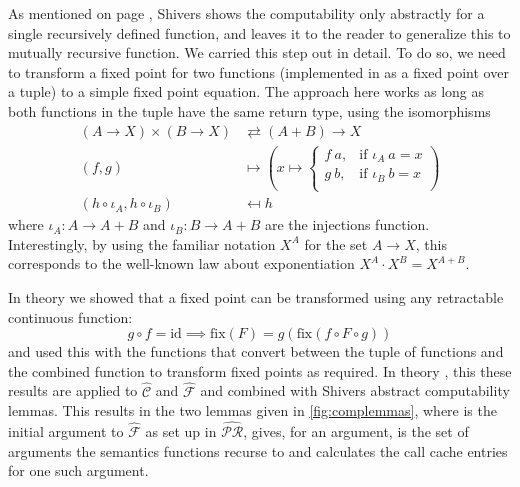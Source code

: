 \documentclass[a4paper,halfparskip,DIV=10,11pt]{scrbook}
\newcommand{\aC}{\widehat{\mathcal C}}
\newcommand{\aF}{\widehat{\mathcal F}}
\newcommand{\aPR}{\widehat{\mathcal {PR}}}
\newcommand{\id}{\text{id}}
\newcommand{\fix}{\text{fix}}
\begin{document}
As mentioned on page \pageref{shiverscomputabilty}, Shivers shows the computability only abstractly for a single recursively defined function, and leaves it to the reader to generalize this to mutually recursive function. We carried this step out in detail. To do so, we need to transform a fixed point for two functions (implemented in  as a fixed point over a tuple) to a simple fixed point equation. The approach here works as long as both functions in the tuple have the same return type, using the isomorphisms
\begin{align*}
(A \to X) \times (B \to X) &\rightleftarrows  (A + B) \to X \\
(f,g) &\mapsto \left(x\mapsto
\begin{cases}
f\ a,&\text{if } \iota_A\ a = x \\
g\ b,&\text{if } \iota_B\ b = x \\
\end{cases} \right) \\
(h \circ  \iota_A, h \circ \iota_B) &\mapsfrom h
\end{align*}
where $\iota_A \colon A \to A + B$ and $\iota_B \colon B \to A + B$ are the injections function. Interestingly, by using the familiar notation $X^A$ for the set $A\to X$, this corresponds to the well-known law about exponentiation $X^A\cdot X^B = X^{A+B}$.

In theory  we showed that a fixed point can be transformed using any retractable continuous function:
\[
g \circ f = \id \implies \fix(F) = g(\fix(f \circ F \circ g))
\]
and used this with the functions that convert between the tuple of functions and the combined function to transform fixed points as required. In theory , this these results are applied to $\aC$ and $\aF$ and combined with Shivers abstract computability lemmas. This results in the two lemmas given in \vref{fig:complemmas}, where  is the initial argument to $\aF$ as set up in $\aPR$,  gives, for an argument, is the set of arguments the semantics functions recurse to and  calculates the call cache entries for one such argument.
\end{document}
